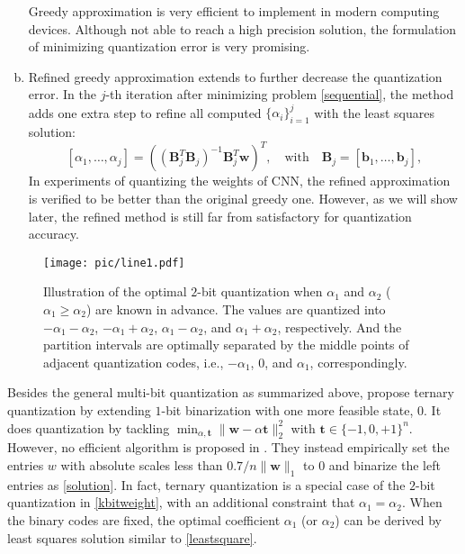 \documentclass{article} %
\newcommand{\w}{\mathbf{w}}
\renewcommand{\b}{\mathbf{b}}
\newcommand{\<}{\left\langle}
\renewcommand{\>}{\right\rangle}
\begin{document}
\begin{enumerate}[(a)]
	   Greedy approximation is very efficient to implement in modern computing devices. Although not able to reach a high precision solution, the formulation of minimizing quantization error is very promising.  
	  
	\item Refined greedy approximation \citep{refinedgreedy}  extends to further decrease the quantization error. In the $j$-th iteration after minimizing problem \eqref{sequential}, the method adds one extra step to refine all computed $\{\alpha_{i}\}_{i=1}^j$ with the least squares solution:
	\begin{equation}\label{leastsquare}
	[\alpha_1, \ldots, \alpha_j]=\left( (\mathbf{B}_j^T \mathbf{B}_j)^{-1} \mathbf{B}_j^T \w \right)^T, \quad \text{with}\quad  \mathbf{B}_j = [\b_1, \ldots, \b_j],
	\end{equation}
	In experiments of quantizing the weights of CNN, the refined approximation is verified to be better than the original greedy one. However, as we will show later,  the refined method is still far from  satisfactory for quantization accuracy. 
\end{enumerate}
\begin{figure}[t!]
	\centering
	\texttt{[image: pic/line1.pdf]} \caption{Illustration of the optimal $2$-bit quantization when $\alpha_1$ and $\alpha_2$ ($\alpha_1 \geq \alpha_2$) are known in advance. The values are  quantized into $-\alpha_1 - \alpha_2$, $-\alpha_1 + \alpha_2$, $\alpha_1 - \alpha_2$, and $\alpha_1 + \alpha_2$, respectively. And the partition intervals are optimally separated by the middle points of  adjacent quantization codes, i.e., $-\alpha_1$, $0$, and $\alpha_1$, correspondingly.}
	\label{interval}   
\end{figure}
Besides the general multi-bit quantization as summarized above, \citet{ternary} propose ternary quantization by extending $1$-bit binarization with one more feasible state, $0$.
It does quantization by tackling $\min_{\alpha, \mathbf{t}}\|\mathbf{w} - \alpha \mathbf{t} \|_2^2$ with $\mathbf{t} \in  \{-1,0,+1\}^n$. However, no efficient algorithm is proposed in \citep{ternary}. They instead empirically set the entries $w$ with absolute scales less than $0.7/n \|\mathbf{w}\|_1$ to $0$ and binarize the left entries as \eqref{solution}. In fact, ternary quantization is a special case of the $2$-bit quantization in \eqref{kbitweight}, with an additional constraint that $\alpha_1 = \alpha_2$. When the binary codes are fixed, the optimal coefficient $\alpha_1$ (or $\alpha_2$) can be derived by least squares solution similar to \eqref{leastsquare}. 
\end{document}
